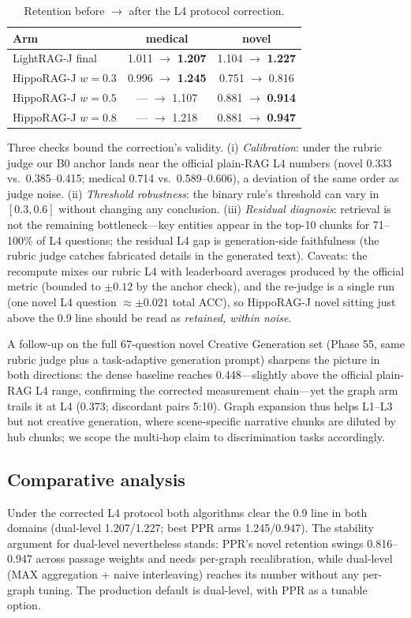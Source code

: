 \begin{table}[t]
\centering
\caption{Retention before $\to$ after the L4 protocol correction.}
\label{tab:l4fix}
\begin{tabular}{@{}lcc@{}}
\toprule
Arm & medical & novel \\
\midrule
LightRAG-J final & 1.011 $\to$ \textbf{1.207} & 1.104 $\to$ \textbf{1.227} \\
HippoRAG-J $w{=}0.3$ & 0.996 $\to$ \textbf{1.245} & 0.751 $\to$ 0.816 \\
HippoRAG-J $w{=}0.5$ & --- $\to$ 1.107 & 0.881 $\to$ \textbf{0.914} \\
HippoRAG-J $w{=}0.8$ & --- $\to$ 1.218 & 0.881 $\to$ \textbf{0.947} \\
\bottomrule
\end{tabular}
\end{table}

Three checks bound the correction's validity. (i) \emph{Calibration}: under the
rubric judge our B0 anchor lands near the official plain-RAG L4 numbers (novel
0.333 vs.\ 0.385--0.415; medical 0.714 vs.\ 0.589--0.606), a deviation of the
same order as judge noise. (ii) \emph{Threshold robustness}: the binary rule's
threshold can vary in $[0.3, 0.6]$ without changing any conclusion.
(iii) \emph{Residual diagnosis}: retrieval is not the remaining
bottleneck---key entities appear in the top-10 chunks for 71--100\% of L4
questions; the residual L4 gap is generation-side faithfulness (the rubric
judge catches fabricated details in the generated text). Caveats: the recompute
mixes our rubric L4 with leaderboard averages produced by the official metric
(bounded to $\pm 0.12$ by the anchor check), and the re-judge is a single run
(one novel L4 question $\approx \pm 0.021$ total ACC), so HippoRAG-J novel
sitting just above the 0.9 line should be read as \emph{retained, within
noise}.

A follow-up on the full 67-question novel Creative Generation set (Phase 55,
same rubric judge plus a task-adaptive generation prompt) sharpens the
picture in both directions: the dense baseline reaches 0.448---slightly above
the official plain-RAG L4 range, confirming the corrected measurement
chain---yet the graph arm trails it at L4 (0.373; discordant pairs 5:10).
Graph expansion thus helps L1--L3 but not creative generation, where
scene-specific narrative chunks are diluted by hub chunks; we scope the
multi-hop claim to discrimination tasks accordingly.

\subsection{Comparative analysis}

Under the corrected L4 protocol both algorithms clear the 0.9 line in both
domains (dual-level 1.207/1.227; best PPR arms 1.245/0.947). The stability
argument for dual-level nevertheless stands: PPR's novel retention swings
0.816--0.947 across passage weights and needs per-graph recalibration, while
dual-level (MAX aggregation + naive interleaving) reaches its number without
any per-graph tuning. The production default is dual-level, with PPR as a
tunable option.

